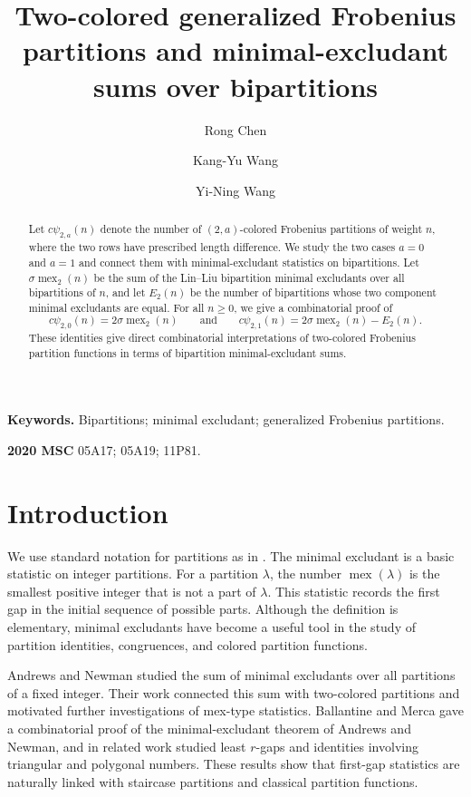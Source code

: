 \documentclass[12pt]{amsart}
\title[Generalized Frobenius partitions and bipartition mex sums]{Two-colored generalized Frobenius partitions and minimal-excludant sums over bipartitions}
\author{Rong Chen}
\author{Kang-Yu Wang}
\author{Yi-Ning Wang}
\theoremstyle{definition}
\theoremstyle{remark}
\numberwithin{equation}{section}
\newcommand{\mex}{\operatorname{mex}}
\newcommand{\cpsi}{c\psi}
\begin{document}
\begin{abstract}
Let $\cpsi_{2,a}(n)$ denote the number of $(2,a)$-colored Frobenius partitions of weight $n$, where the two rows have prescribed length difference.  We study the two cases $a=0$ and $a=1$ and connect them with minimal-excludant statistics on bipartitions.  Let $\sigma\mex_2(n)$ be the sum of the Lin--Liu bipartition minimal excludants over all bipartitions of $n$, and let $E_2(n)$ be the number of bipartitions whose two component minimal excludants are equal.  For all $n\geq 0$, we give a combinatorial proof of
\[
\cpsi_{2,0}(n)=2\sigma\mex_2(n)
\qquad\text{and}\qquad
\cpsi_{2,1}(n)=2\sigma\mex_2(n)-E_2(n).
\]
These identities give direct combinatorial interpretations of two-colored Frobenius partition functions in terms of bipartition minimal-excludant sums.
\end{abstract}

\maketitle

\noindent
\textbf{Keywords.} Bipartitions; minimal excludant; generalized Frobenius partitions.

\noindent
\textbf{2020 MSC} 05A17; 05A19; 11P81.

\section{Introduction}

We use standard notation for partitions as in \cite{AndrewsPartitions}.  The minimal excludant is a basic statistic on integer partitions.  For a partition $\lambda$, the number $\mex(\lambda)$ is the smallest positive integer that is not a part of $\lambda$.  This statistic records the first gap in the initial sequence of possible parts.  Although the definition is elementary, minimal excludants have become a useful tool in the study of partition identities, congruences, and colored partition functions.

Andrews and Newman \cite{AndrewsNewman} studied the sum of minimal excludants over all partitions of a fixed integer.  Their work connected this sum with two-colored partitions and motivated further investigations of mex-type statistics.  Ballantine and Merca \cite{BallantineMercaCombinatorial} gave a combinatorial proof of the minimal-excludant theorem of Andrews and Newman, and in related work \cite{BallantineMerca} studied least $r$-gaps and identities involving triangular and polygonal numbers.  These results show that first-gap statistics are naturally linked with staircase partitions and classical partition functions.
\end{document}
